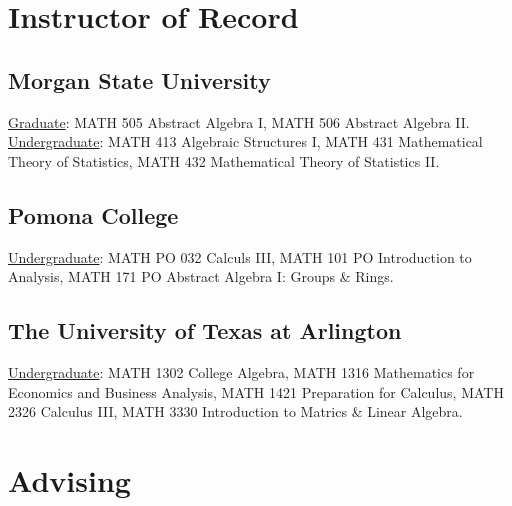 \documentclass[10pt,a4paper]{article}
\newcommand{\MSU}{Morgan State University}
\newcommand{\UTA}{The University of Texas at Arlington}
\newcommand{\Pomona}{Pomona College}
\begin{document}
\section{Instructor of Record}
\vspace{0.1in}

    \subsection{\MSU}
\href{https://catalog.morgan.edu/preview_program.php?catoid=25\&poid=5681\&hl}{Graduate}: MATH 505 Abstract Algebra I, MATH 506 Abstract Algebra II.\\
\href{https://catalog.morgan.edu/preview_program.php?catoid=24\&poid=5514\&hl}{Undergraduate}: MATH 413 Algebraic Structures I, MATH 431 Mathematical Theory of Statistics, MATH 432 Mathematical Theory of Statistics II.

    \subsection{\Pomona}
\href{https://catalog.pomona.edu/content.php?filter%5B27%5D=MATH&filter%5B29%5D=&filter%5Bcourse_type%5D=-1&filter%5Bkeyword%5D=&filter%5B32%5D=1&filter%5Bcpage%5D=1&cur_cat_oid=43&expand=&navoid=8669&search_database=Filter&filter%5Bexact_match%5D=1#acalog_template_course_filter}{Undergraduate}: MATH PO 032 Calculs III, MATH 101 PO Introduction to Analysis, MATH 171 PO Abstract Algebra I: Groups \& Rings.

    \subsection{\UTA}
\href{https://catalog.uta.edu/archives/2019-2020/coursedescriptions/math/}{Undergraduate}: MATH 1302 College Algebra, MATH 1316
Mathematics for Economics and Business Analysis, MATH 1421 Preparation for Calculus, MATH 2326 Calculus III, MATH 3330 Introduction to Matrics \& Linear Algebra.
\section{Advising}
\vspace{0.1in}
\end{document}
